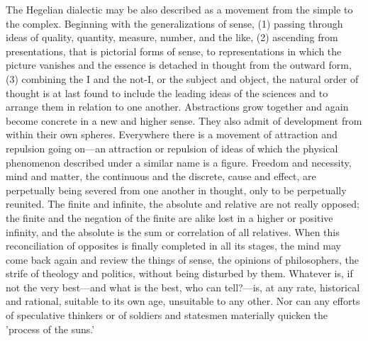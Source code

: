 \documentclass[11pt,letter]{article}
\begin{document}
\par  The Hegelian dialectic may be also described as a movement from the simple to the complex. Beginning with the generalizations of sense, (1) passing through ideas of quality, quantity, measure, number, and the like, (2) ascending from presentations, that is pictorial forms of sense, to representations in which the picture vanishes and the essence is detached in thought from the outward form, (3) combining the I and the not-I, or the subject and object, the natural order of thought is at last found to include the leading ideas of the sciences and to arrange them in relation to one another. Abstractions grow together and again become concrete in a new and higher sense. They also admit of development from within their own spheres. Everywhere there is a movement of attraction and repulsion going on—an attraction or repulsion of ideas of which the physical phenomenon described under a similar name is a figure. Freedom and necessity, mind and matter, the continuous and the discrete, cause and effect, are perpetually being severed from one another in thought, only to be perpetually reunited. The finite and infinite, the absolute and relative are not really opposed; the finite and the negation of the finite are alike lost in a higher or positive infinity, and the absolute is the sum or correlation of all relatives. When this reconciliation of opposites is finally completed in all its stages, the mind may come back again and review the things of sense, the opinions of philosophers, the strife of theology and politics, without being disturbed by them. Whatever is, if not the very best—and what is the best, who can tell?—is, at any rate, historical and rational, suitable to its own age, unsuitable to any other. Nor can any efforts of speculative thinkers or of soldiers and statesmen materially quicken the 'process of the suns.'
\end{document}
